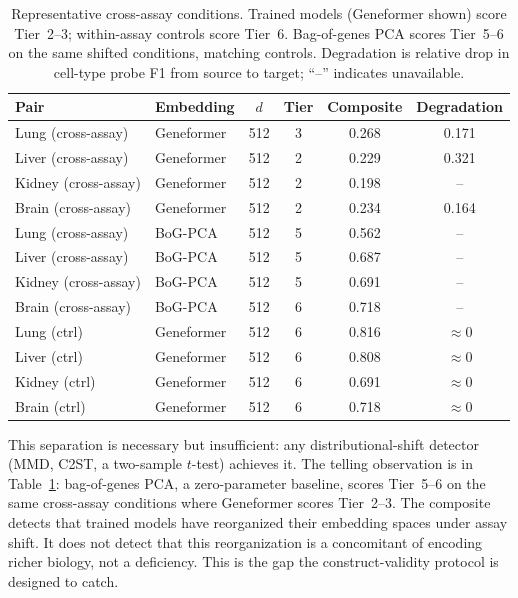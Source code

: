 \documentclass[9pt,lineno]{elife}
\begin{document}
\begin{table}[t]
\centering
\caption{Representative cross-assay conditions. Trained models (Geneformer shown) score Tier~2--3; within-assay controls score Tier~6. Bag-of-genes PCA scores Tier~5--6 on the same shifted conditions, matching controls. Degradation is relative drop in cell-type probe F1 from source to target; ``--'' indicates unavailable.}
\label{tab:separation}
\small
\begin{tabular}{@{}llcccc@{}}
\toprule
Pair & Embedding & $d$ & Tier & Composite & Degradation \\
\midrule
Lung (cross-assay) & Geneformer & 512 & 3 & 0.268 & 0.171 \\
Liver (cross-assay) & Geneformer & 512 & 2 & 0.229 & 0.321 \\
Kidney (cross-assay) & Geneformer & 512 & 2 & 0.198 & -- \\
Brain (cross-assay) & Geneformer & 512 & 2 & 0.234 & 0.164 \\
\midrule
Lung (cross-assay) & BoG-PCA & 512 & 5 & 0.562 & -- \\
Liver (cross-assay) & BoG-PCA & 512 & 5 & 0.687 & -- \\
Kidney (cross-assay) & BoG-PCA & 512 & 5 & 0.691 & -- \\
Brain (cross-assay) & BoG-PCA & 512 & 6 & 0.718 & -- \\
\midrule
Lung (ctrl) & Geneformer & 512 & 6 & 0.816 & $\approx 0$ \\
Liver (ctrl) & Geneformer & 512 & 6 & 0.808 & $\approx 0$ \\
Kidney (ctrl) & Geneformer & 512 & 6 & 0.691 & $\approx 0$ \\
Brain (ctrl) & Geneformer & 512 & 6 & 0.718 & $\approx 0$ \\
\bottomrule
\end{tabular}
\end{table}

This separation is necessary but insufficient: any distributional-shift detector (MMD, C2ST, a two-sample $t$-test) achieves it. The telling observation is in Table~\ref{tab:separation}: bag-of-genes PCA, a zero-parameter baseline, scores Tier~5--6 on the same cross-assay conditions where Geneformer scores Tier~2--3. The composite detects that trained models have reorganized their embedding spaces under assay shift. It does not detect that this reorganization is a concomitant of encoding richer biology, not a deficiency. This is the gap the construct-validity protocol is designed to catch.
\end{document}
